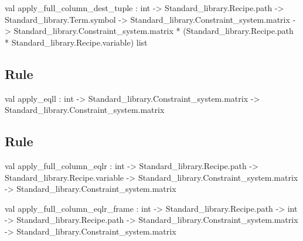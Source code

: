 \label{val:Rules.apply-underscorefull-underscorecolumn-underscoredest-underscoretuple}\begin{ocamldoccode}
val apply_full_column_dest_tuple :
  int ->
  Standard_library.Recipe.path ->
  Standard_library.Term.symbol ->
  Standard_library.Constraint_system.matrix ->
  Standard_library.Constraint_system.matrix *
  (Standard_library.Recipe.path * Standard_library.Recipe.variable) list
\end{ocamldoccode}




\subsection{Rule \Eqll  }




\label{val:Rules.apply-underscoreeqll}\begin{ocamldoccode}
val apply_eqll :
  int ->
  Standard_library.Constraint_system.matrix ->
  Standard_library.Constraint_system.matrix
\end{ocamldoccode}




\subsection{Rule \Eqlr  }




\label{val:Rules.apply-underscorefull-underscorecolumn-underscoreeqlr}\begin{ocamldoccode}
val apply_full_column_eqlr :
  int ->
  Standard_library.Recipe.path ->
  Standard_library.Recipe.variable ->
  Standard_library.Constraint_system.matrix ->
  Standard_library.Constraint_system.matrix
\end{ocamldoccode}




\label{val:Rules.apply-underscorefull-underscorecolumn-underscoreeqlr-underscoreframe}\begin{ocamldoccode}
val apply_full_column_eqlr_frame :
  int ->
  Standard_library.Recipe.path ->
  int ->
  Standard_library.Recipe.path ->
  Standard_library.Constraint_system.matrix ->
  Standard_library.Constraint_system.matrix
\end{ocamldoccode}




